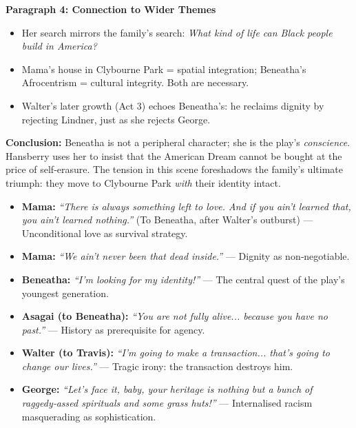 \documentclass[11pt]{article}
\newcommand{\cle}[1]{{\popxbold\color{popdark}#1}}
\newcounter{popsec}
\newcounter{popsub}
\newcommand{\courssub}[1]{%
  \stepcounter{popsub}%
  \par\vspace{9pt}\noindent{\popxbold\fontsize{11.5}{13}\selectfont\color{popink}{\color{poporange}\thepopsec.\thepopsub}\hspace{6pt}#1}\par\nopagebreak\vspace{4pt}
}
\begin{document}
\begin{exoresolu}[Question]
\textbf{Paragraph 4: Connection to Wider Themes}
\begin{itemize}
\item Her search mirrors the family's search: \emph{What kind of life can Black people build in America?}
\item Mama's house in Clybourne Park = spatial integration; Beneatha's Afrocentrism = cultural integrity. Both are necessary.
\item Walter's later growth (Act 3) echoes Beneatha's: he reclaims dignity by rejecting Lindner, just as she rejects George.
\end{itemize}

\textbf{Conclusion:}
Beneatha is not a peripheral character; she is the play's \emph{conscience}. Hansberry uses her to insist that the American Dream cannot be bought at the price of self‑erasure. The tension in this scene foreshadows the family's ultimate triumph: they move to Clybourne Park \emph{with} their identity intact.
\end{exoresolu}

\courssub{Key Quotations for Revision}

\begin{aretenir}
\begin{itemize}
\item \textbf{Mama:} \emph{``There is always something left to love. And if you ain't learned that, you ain't learned nothing.''} (To Beneatha, after Walter's outburst) — \cle{Unconditional love as survival strategy}.
\item \textbf{Mama:} \emph{``We ain't never been that dead inside.''} — \cle{Dignity as non‑negotiable}.
\item \textbf{Beneatha:} \emph{``I'm looking for my identity!''} — \cle{The central quest of the play's youngest generation}.
\item \textbf{Asagai (to Beneatha):} \emph{``You are not fully alive... because you have no past.''} — \cle{History as prerequisite for agency}.
\item \textbf{Walter (to Travis):} \emph{``I'm going to make a transaction... that's going to change our lives.''} — \cle{Tragic irony: the transaction destroys him}.
\item \textbf{George:} \emph{``Let's face it, baby, your heritage is nothing but a bunch of raggedy‑assed spirituals and some grass huts!''} — \cle{Internalised racism masquerading as sophistication}.
\end{itemize}
\end{aretenir}
\end{document}
